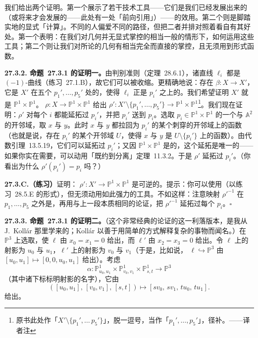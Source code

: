 我们给出两个证明。第一个展示了若干技术工具——它们是我们已经发展出来的（或将来才会发展的——此处有一处「前向引用」）——的效用。第二个则是脚踏实地的显式「计算」。不同的人偏爱不同的路径，但把二者并排对照着看自有其好处。第一个表明：在我们对几何并无显式掌控的相当一般的情形下，如何运用这些工具；第二个则让我们对所论的几何有相当完全而直接的掌控，且无须用到形式函数。

\textbf{27.3.2. \mbox{命题~27.3.1} 的证明一。}\quad 由\trCastelnuovo{}判别准则（\mbox{定理~28.6.1}），诸直线 $\ell_i$ 都是 $(-1)$-曲线（\mbox{练习~27.1.B}），故它们可以被收缩。更精确地说：存在\trMorphism{} $\beta\colon X\to X'$，它是 $X'$ 在五个\trClosedPoint{} $p_1',\dots,p_5'$ 处的\trBlowup{}，使得 $\ell_i$ 正是 $p_i'$ 之上的\trExceptionalDivisor{}。我们希望证明 $X'$ 就是 $\mathbb{P}^1\times\mathbb{P}^1$。\trMorphism{} $\rho\colon X\to\mathbb{P}^1\times\mathbb{P}^1$ 给出\trMorphism{} $\rho'\colon X'\setminus\{p_1',\dots,p_5'\}\to\mathbb{P}^1\times\mathbb{P}^1$\footnote{原书此处作「$X'\setminus\{p_1',\ldots\,p_5'\}$」，脱一逗号，当作「$p_1',\ldots,p_5'$」，径补。——译者注}。我们现在证明：$\rho'$ 对每个 $i$ 都能延拓过 $p_i'$，并把 $p_i'$ 送到 $p_i$。选取 $p_i\in\mathbb{P}^1\times\mathbb{P}^1$ 的一个与 $\mathbb{A}^2$ \trIsomorphic{}的开邻域，取\trCoordinate{} $x$ 与 $y$。此时 $x$ 与 $y$ 都拉回为 $p_i'$ 的某个刺穿的开邻域上的函数（也就是说，存在 $p_i'$ 的某个开邻域 $U$，使得 $x$ 与 $y$ 是 $U\setminus\{p_i'\}$ 上的函数）。由\mbox{代数\trHartogs{}引理~13.5.19}，它们可以延拓过 $p_i'$；又因 $\mathbb{P}^1\times\mathbb{P}^1$ 是\trSeparated{}的，这个延拓是唯一的——如果你实在需要，可以动用\mbox{「既约到分离」定理~11.3.2}。于是 $\rho'$ 延拓过 $p_i'$。（你看出为什么 $\rho'(p_i')=p_i$ 吗？）

\textbf{27.3.C.（练习）}\quad 证明：\trBirational{}\trMorphism{} $\rho'\colon X'\to\mathbb{P}^1\times\mathbb{P}^1$ 是可逆的。提示：你可以使用\trZariskiMainTheorem{}（以\mbox{练习~28.5.E} 的形式），但无须动用如此强力的工具。不如这样：注意\trBirational{}映射 $\rho'^{-1}$ 在 $p_1,\dots,p_5$ 之外是\trMorphism{}，再用与上一段本质相同的论证，把 $\rho'^{-1}$ 延拓过每个 $p_i$。\hfill$\square$

\textbf{27.3.3. \mbox{命题~27.3.1} 的证明二。}\quad （这个非常经典的论证的这一利落版本，是我从 J.~Koll\'ar 那里学来的；Koll\'ar 以善于用简单的方式解释复杂的事物而闻名。）在 $\mathbb{P}^3$ 上选取\trCoordinate{}，使 $\ell$ 由 $x_0=x_1=0$ 给出，而 $\ell'$ 由 $x_2=x_3=0$ 给出。令 $\ell$ 上的射影\trCoordinate{}为 $u_0$ 与 $u_1$，$\ell'$ 上的射影\trCoordinate{}为 $v_0$ 与 $v_1$（于是，比如说，\trInclusionMap{} $\ell\hookrightarrow\mathbb{P}^3$ 由 $[u_0,u_1]\mapsto[0,0,u_0,u_1]$ 给出）。考虑\trRationalMap
\[
\alpha\colon\mathbb{P}^1_{u_0,u_1}\times\mathbb{P}^1_{v_0,v_1}\times\mathbb{P}^1_{s,t}\longrightarrow\mathbb{P}^3
\]
（其中诸下标标明射影\trCoordinate{}的名字），它由
\[
\tag{27.3.3.1}\label{eq:alpha-cubic-map}
([u_0,u_1],\,[v_0,v_1],\,[s,t])\mapsto[sv_0,\,sv_1,\,tu_0,\,tu_1].
\]
给出。

